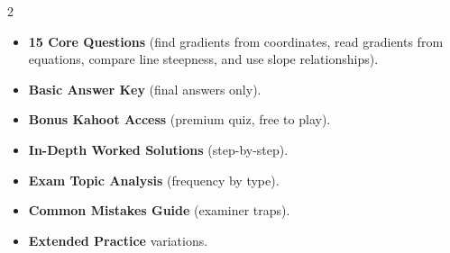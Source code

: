 \documentclass[11pt,a4paper]{article}
\newcommand{\FullReleaseDate}{April 30, 2026}
\begin{document}
\vspace{8pt}

\begin{multicols}{2}
  \begin{tcolorbox}[card, title=\sffamily\bfseries\textcolor{white}{\faHandPointDown\ TODAY (Simplified Version)}, colbacktitle=mainblue, boxed title style={sharp corners, boxrule=0pt}]
    \begin{itemize}[leftmargin=1.2em, itemsep=2pt]
      \item \small \textbf{15 Core Questions} (find gradients from coordinates, read gradients from equations, compare line steepness, and use slope relationships).
      \item \small \textbf{Basic Answer Key} (final answers only).
      \item \small \textbf{Bonus Kahoot Access} (premium quiz, free to play).
    \end{itemize}
  \end{tcolorbox}

  \columnbreak

  \begin{tcolorbox}[card, title=\sffamily\bfseries\textcolor{white}{\faRocket\ ON \FullReleaseDate\ (Full Upgrade)}, colbacktitle=mainblue, boxed title style={sharp corners, boxrule=0pt}]
    \begin{itemize}[leftmargin=1.2em, itemsep=2pt]
      \item \small \textbf{In-Depth Worked Solutions} (step-by-step).
      \item \small \textbf{Exam Topic Analysis} (frequency by type).
      \item \small \textbf{Common Mistakes Guide} (examiner traps).
      \item \small \textbf{Extended Practice} variations.
    \end{itemize}
  \end{tcolorbox}
\end{multicols}
\end{document}

